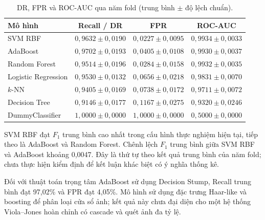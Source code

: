 \documentclass[12pt,a4paper,oneside]{report}
\begin{document}
\begin{table}[H]
    \centering
    \small
    \caption{DR, FPR và ROC-AUC qua năm fold
    (trung bình $\pm$ độ lệch chuẩn).}
    \label{tab:cv_dr_fpr_auc}
    \begin{tabular}{lccc}
        \toprule
        \textbf{Mô hình}
        & \textbf{Recall / DR}
        & \textbf{FPR}
        & \textbf{ROC-AUC} \\
        \midrule
        SVM RBF
        & $0{,}9632 \pm 0{,}0190$
        & $0{,}0227 \pm 0{,}0095$
        & $0{,}9934 \pm 0{,}0033$ \\

        AdaBoost
        & $0{,}9702 \pm 0{,}0193$
        & $0{,}0405 \pm 0{,}0108$
        & $0{,}9930 \pm 0{,}0037$ \\

        Random Forest
        & $0{,}9514 \pm 0{,}0196$
        & $0{,}0284 \pm 0{,}0158$
        & $0{,}9932 \pm 0{,}0035$ \\

        Logistic Regression
        & $0{,}9530 \pm 0{,}0132$
        & $0{,}0656 \pm 0{,}0218$
        & $0{,}9831 \pm 0{,}0070$ \\

        $k$-NN
        & $0{,}9405 \pm 0{,}0169$
        & $0{,}0738 \pm 0{,}0172$
        & $0{,}9711 \pm 0{,}0072$ \\

        Decision Tree
        & $0{,}9146 \pm 0{,}0177$
        & $0{,}1167 \pm 0{,}0275$
        & $0{,}9320 \pm 0{,}0246$ \\

        DummyClassifier
        & $1{,}0000 \pm 0{,}0000$
        & $1{,}0000 \pm 0{,}0000$
        & $0{,}5000 \pm 0{,}0000$ \\
        \bottomrule
    \end{tabular}
\end{table}

SVM RBF đạt $F_1$ trung bình cao nhất trong cấu hình
thực nghiệm hiện tại, tiếp theo là AdaBoost và
Random Forest. Chênh lệch $F_1$ trung bình giữa SVM RBF
và AdaBoost khoảng 0,0047. Đây là thứ tự theo kết quả
trung bình của năm fold; chưa thực hiện kiểm định
để kết luận khác biệt có ý nghĩa thống kê.

Đối với thuật toán trọng tâm AdaBoost sử dụng
Decision Stump, Recall trung bình đạt 97,02\% và
FPR đạt 4,05\%. Mô hình sử dụng đặc trưng Haar-like
và boosting để phân loại cửa sổ ảnh; kết quả này
chưa đại diện cho một hệ thống Viola--Jones hoàn chỉnh
có cascade và quét ảnh đa tỷ lệ.
\end{document}
